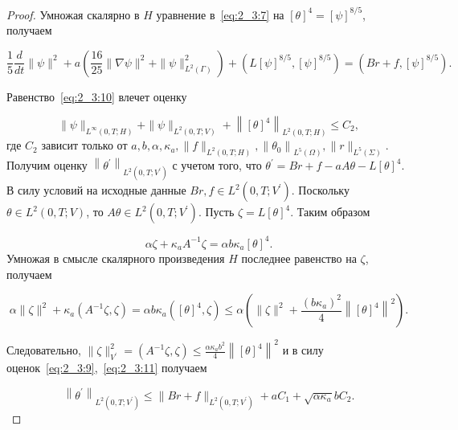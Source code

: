 \begin{proof}
    Умножая скалярно в $H$ уравнение в~\eqref{eq:2_3:7}
    на $[\theta]^{4}=[\psi]^{8 / 5}$, получаем

    \begin{equation}
        \label{eq:2_3:10}
        \frac{1}{5} \frac{d}{d t}\|\psi\|^{2}+a\left(\frac{16}{25}\|\nabla \psi\|^{2}
        + \|\psi\|_{L^{2}(\Gamma)}^{2}\right)+
        \left(L[\psi]^{8 / 5},[\psi]^{8 / 5}\right)=\left(B r+f,[\psi]^{8 / 5}\right).
    \end{equation}

    Равенство~\eqref{eq:2_3:10} влечет оценку

    \begin{equation}
        \label{eq:2_3:11}
        \|\psi\|_{L^{\infty}(0, T ; H)}+\|\psi\|_{L^{2}(0, T ; V)}+
        \left\|[\theta]^{4}\right\|_{L^{2}(0, T ; H)} \leq C_{2},
    \end{equation}
    где $C_{2}$ зависит только от
    $a, b, \alpha, \kappa_{a},\|f\|_{L^{2}(0, T ; H)},
    \left\|\theta_{0}\right\|_{L^{5}(\Omega)},\|r\|_{L^{5}(\Sigma)}$.
    Получим оценку
    $\left\|\theta^{\prime}\right\|_{L^{2}\left(0, T ; V^{\prime}\right)}$
    с учетом того, что $ \theta^{\prime}=B r+f-a A \theta-L[\theta]^{4}$.
    В силу условий на исходные данные
    $B r, f \in L^{2}\left(0, T ; V^{\prime}\right)$.
    Поскольку $\theta \in L^{2}(0, T ; V)$,
    то $A \theta \in L^{2}\left(0, T ; V^{\prime}\right)$.
    Пусть $\zeta=L[\theta]^{4}$.
    Таким образом

    \[
        \alpha \zeta+\kappa_{a} A^{-1} \zeta=\alpha b \kappa_{a}[\theta]^{4}.
    \]
    Умножая в смысле скалярного произведения $H$
    последнее равенство на $\zeta$, получаем

    \[
        \alpha\|\zeta\|^{2}+\kappa_{a}\left(A^{-1} \zeta,
        \zeta\right)=\alpha b \kappa_{a}\left([\theta]^{4},
        \zeta\right) \leq \alpha\left(\|\zeta\|^{2}
        +\frac{\left(b \kappa_{a}\right)^{2}}{4}\left\|
        [\theta]^{4}\right\|^{2}\right).
    \]


    Следовательно, $\|\zeta\|_{V^{\prime}}^{2}=\left(A^{-1} \zeta,
    \zeta\right) \leq \frac{\alpha \kappa_{ a} b^{2}}{4}\left\|[\theta]^{4}\right\|^{2}$
    и в силу оценок~\eqref{eq:2_3:9},~\eqref{eq:2_3:11} получаем

    \begin{equation}
        \label{eq:2_3:12}
        \left\|\theta^{\prime}\right\|_{L^{2}\left(0, T; V^{\prime}\right)}
        \leq\|B r+f\|_{L^{2}\left(0, T ; V^{\prime}\right)}+a C_{1}+\sqrt{\alpha \kappa_{a}} b C_{2}.
    \end{equation}



\end{proof}
